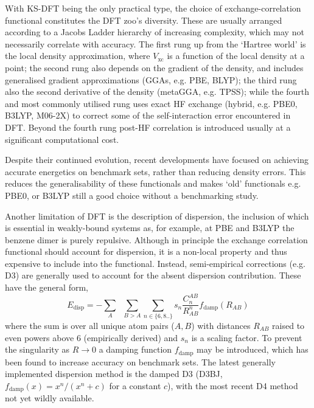 \documentclass[main.tex]{subfiles}
\begin{document}
With KS-DFT being the only practical type, the choice of exchange-correlation functional constitutes the DFT zoo's diversity. These are usually arranged according to a Jacobs Ladder hierarchy of increasing complexity, which may not necessarily correlate with accuracy.\cite{Perdew2001} The first rung up from the `Hartree world' is the local density approximation, where $V_\text{xc}$ is a function of the local density at a point; the second rung also depends on the gradient of the density, and includes generalised gradient approximations (GGAs, e.g. PBE,\cite{Perdew1996} BLYP\cite{BLYP_B_1988, LYP_1988}); the third rung also the second derivative of the density (metaGGA, e.g. TPSS\cite{TPSS}); while the fourth and most commonly utilised rung uses exact HF exchange (hybrid, e.g. PBE0,\cite{Adamo1999} B3LYP,\cite{Stephens1994, Becke1993} M06-2X\cite{Zhao2007}) to correct some of the self-interaction error encountered in DFT. Beyond the fourth rung post-HF correlation is introduced usually at a significant computational cost.

Despite their continued evolution, recent developments have focused on achieving accurate energetics on benchmark sets, rather than reducing density errors.\cite{Mardirossian2017}
This reduces the generalisability of these functionals and makes `old' functionals e.g. PBE0, or B3LYP still a good choice without a benchmarking study.\cite{Becke2014, Cohen2011}

Another limitation of DFT is the description of dispersion, the inclusion of which is essential in weakly-bound systems as, for example, at PBE and B3LYP the benzene dimer is purely repulsive.\cite{Puzder2006} Although in principle the exchange correlation functional should account for dispersion, it is a non-local property and thus expensive to include into the functional.\cite{GrimmeDisp2011} Instead, semi-empirical corrections (e.g. D3\cite{Grimme2010}) are generally used to account for the absent dispersion contribution. These have the general form,
\begin{equation}
	E_\text{disp} = -\sum_{A}\;\;\sum_{B>A}\sum_{n\in\{6, 8..\}} s_n\frac{C_n^{AB}}{R_{AB}^n} f_\text{damp}(R_{AB})
	\label{equation::dft_d}
\end{equation} 
where the sum is over all unique atom pairs ($A, B$) with distances $R_{AB}$ raised to even powers above 6 (empirically derived) and $s_n$ is a scaling factor. To prevent the singularity as $R\rightarrow0$ a damping function $f_\text{damp}$ may be introduced, which has been found to increase accuracy on benchmark sets.\cite{Mardirossian2017} The latest generally implemented dispersion method is the damped D3 (D3BJ, $f_\text{damp}(x) = x^n/(x^n + c)$ for a constant $c$),\cite{Becke2005, BJdamping} with the most recent D4 method not yet wildly available. 
\end{document}
